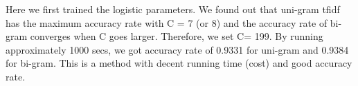 
Here we first trained the logistic parameters. We found out that uni-gram tfidf has the maximum accuracy rate with C = 7 (or 8) and the accuracy rate of bi-gram converges when C goes larger. Therefore, we set C= 199. By running approximately 1000 secs, we got accuracy rate of 0.9331 for uni-gram and 0.9384 for bi-gram. This is a method with decent running time (cost) and good accuracy rate. \\